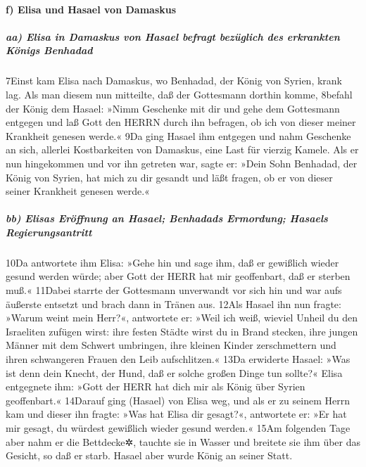 \hypertarget{f-elisa-und-hasael-von-damaskus}{%
\paragraph{f) Elisa und Hasael von
Damaskus}\label{f-elisa-und-hasael-von-damaskus}}

\hypertarget{aa-elisa-in-damaskus-von-hasael-befragt-bezuxfcglich-des-erkrankten-kuxf6nigs-benhadad}{%
\subparagraph{aa) Elisa in Damaskus von Hasael befragt bezüglich des
erkrankten Königs
Benhadad}\label{aa-elisa-in-damaskus-von-hasael-befragt-bezuxfcglich-des-erkrankten-kuxf6nigs-benhadad}}

7Einst kam Elisa nach Damaskus, wo Benhadad, der König von Syrien, krank
lag. Als man diesem nun mitteilte, daß der Gottesmann dorthin komme,
8befahl der König dem Hasael: »Nimm Geschenke mit dir und gehe dem
Gottesmann entgegen und laß Gott den HERRN durch ihn befragen, ob ich
von dieser meiner Krankheit genesen werde.« 9Da ging Hasael ihm entgegen
und nahm Geschenke an sich, allerlei Kostbarkeiten von Damaskus, eine
Last für vierzig Kamele. Als er nun hingekommen und vor ihn getreten
war, sagte er: »Dein Sohn Benhadad, der König von Syrien, hat mich zu
dir gesandt und läßt fragen, ob er von dieser seiner Krankheit genesen
werde.«

\hypertarget{bb-elisas-eruxf6ffnung-an-hasael-benhadads-ermordung-hasaels-regierungsantritt}{%
\subparagraph{bb) Elisas Eröffnung an Hasael; Benhadads Ermordung;
Hasaels
Regierungsantritt}\label{bb-elisas-eruxf6ffnung-an-hasael-benhadads-ermordung-hasaels-regierungsantritt}}

10Da antwortete ihm Elisa: »Gehe hin und sage ihm, daß er gewißlich
wieder gesund werden würde; aber Gott der HERR hat mir geoffenbart, daß
er sterben muß.« 11Dabei starrte der Gottesmann unverwandt vor sich hin
und war aufs äußerste entsetzt und brach dann in Tränen aus. 12Als
Hasael ihn nun fragte: »Warum weint mein Herr?«, antwortete er: »Weil
ich weiß, wieviel Unheil du den Israeliten zufügen wirst: ihre festen
Städte wirst du in Brand stecken, ihre jungen Männer mit dem Schwert
umbringen, ihre kleinen Kinder zerschmettern und ihren schwangeren
Frauen den Leib aufschlitzen.« 13Da erwiderte Hasael: »Was ist denn dein
Knecht, der Hund, daß er solche großen Dinge tun sollte?« Elisa
entgegnete ihm: »Gott der HERR hat dich mir als König über Syrien
geoffenbart.« 14Darauf ging (Hasael) von Elisa weg, und als er zu seinem
Herrn kam und dieser ihn fragte: »Was hat Elisa dir gesagt?«, antwortete
er: »Er hat mir gesagt, du würdest gewißlich wieder gesund werden.« 15Am
folgenden Tage aber nahm er die Bettdecke✲, tauchte sie in Wasser und
breitete sie ihm über das Gesicht, so daß er starb. Hasael aber wurde
König an seiner Statt.

